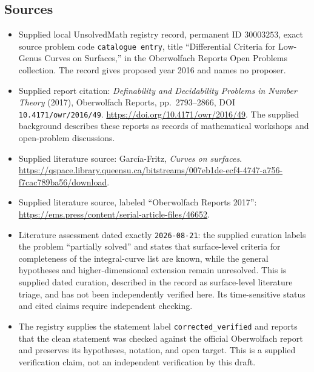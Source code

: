 \documentclass[11pt]{article}
\begin{document}
\subsection{Sources}
\begin{itemize}
\item Supplied local UnsolvedMath registry record, permanent ID \(30003253\), exact source problem code \texttt{catalogue entry}, title ``Differential Criteria for Low-Genus Curves on Surfaces,'' in the Oberwolfach Reports Open Problems collection. The record gives proposed year 2016 and names no proposer.
\item Supplied report citation: \emph{Definability and Decidability Problems in Number Theory} (2017), Oberwolfach Reports, pp.~2793--2866, DOI \texttt{10.4171/owr/2016/49}. \url{https://doi.org/10.4171/owr/2016/49}. The supplied background describes these reports as records of mathematical workshops and open-problem discussions.
\item Supplied literature source: Garc\'ia-Fritz, \emph{Curves on surfaces}. \url{https://qspace.library.queensu.ca/bitstreams/007eb1de-ecf4-4747-a756-f7cac789ba56/download}.
\item Supplied literature source, labeled ``Oberwolfach Reports 2017'': \url{https://ems.press/content/serial-article-files/46652}.
\item Literature assessment dated exactly \texttt{2026-08-21}: the supplied curation labels the problem ``partially solved'' and states that surface-level criteria for completeness of the integral-curve list are known, while the general hypotheses and higher-dimensional extension remain unresolved. This is supplied dated curation, described in the record as surface-level literature triage, and has not been independently verified here. Its time-sensitive status and cited claims require independent checking.
\item The registry supplies the statement label \texttt{corrected\_verified} and reports that the clean statement was checked against the official Oberwolfach report and preserves its hypotheses, notation, and open target. This is a supplied verification claim, not an independent verification by this draft.
\end{itemize}
\end{document}
